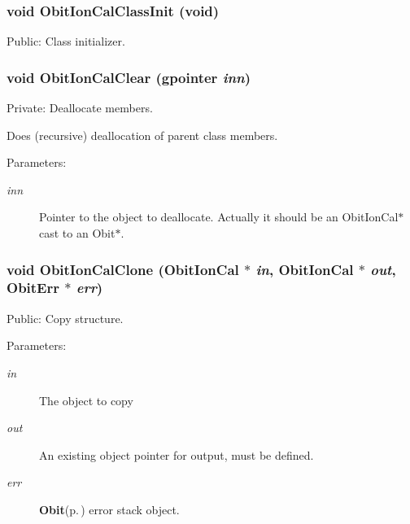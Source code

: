 \subsubsection{\setlength{\rightskip}{0pt plus 5cm}void Obit\-Ion\-Cal\-Class\-Init (void)}\label{ObitIonCal_8c_a51}


Public: Class initializer. 

\subsubsection{\setlength{\rightskip}{0pt plus 5cm}void Obit\-Ion\-Cal\-Clear (gpointer {\em inn})}\label{ObitIonCal_8c_a15}


Private: Deallocate members. 

Does (recursive) deallocation of parent class members. \begin{Desc}
\item[Parameters:]
\begin{description}
\item[{\em inn}]Pointer to the object to deallocate. Actually it should be an Obit\-Ion\-Cal$\ast$ cast to an Obit$\ast$. \end{description}
\end{Desc}
\subsubsection{\setlength{\rightskip}{0pt plus 5cm}void Obit\-Ion\-Cal\-Clone ({\bf Obit\-Ion\-Cal} $\ast$ {\em in}, {\bf Obit\-Ion\-Cal} $\ast$ {\em out}, {\bf Obit\-Err} $\ast$ {\em err})}\label{ObitIonCal_8c_a43}


Public: Copy structure. 

\begin{Desc}
\item[Parameters:]
\begin{description}
\item[{\em in}]The object to copy \item[{\em out}]An existing object pointer for output, must be defined. \item[{\em err}]{\bf Obit}{\rm (p.\,\pageref{structObit})} error stack object. \end{description}
\end{Desc}
